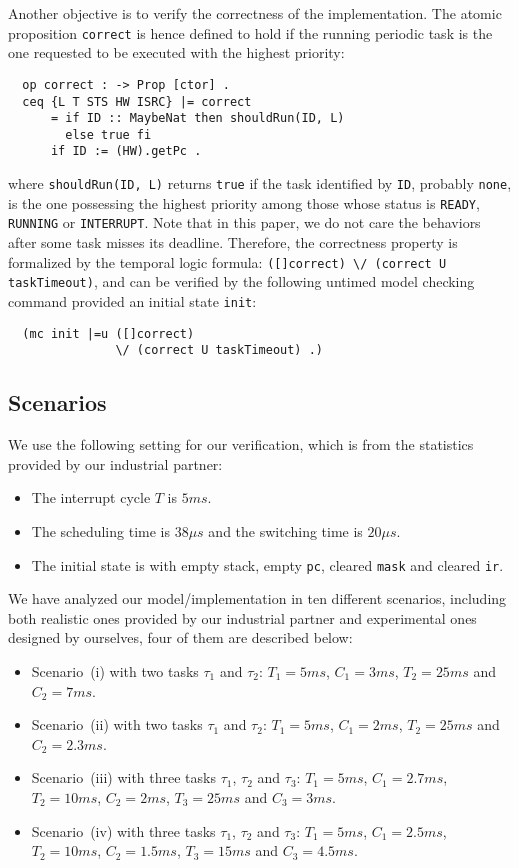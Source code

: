 \documentclass[10pt,journal]{IEEEtran}
\newcommand{\hide}[1]{\ignorespaces}
\begin{document}
Another objective is to verify the correctness of the implementation.
The atomic proposition \verb|correct| is hence defined to hold if the
running periodic task is the one requested to be executed with the
highest priority:
\begin{verbatim}
  op correct : -> Prop [ctor] .
  ceq {L T STS HW ISRC} |= correct
      = if ID :: MaybeNat then shouldRun(ID, L)
        else true fi
      if ID := (HW).getPc .
\end{verbatim}
where \verb|shouldRun(ID, L)| returns \verb|true| if the task
identified by \verb|ID|, probably \verb|none|, is the one possessing
the highest priority among those whose status is \verb|READY|,
\verb|RUNNING| or \verb|INTERRUPT|. Note that in this paper, we do not
care the behaviors after some task misses its deadline. Therefore, the
correctness property is formalized by the temporal logic formula:
\verb|([]correct) \/ (correct U taskTimeout)|, and can be verified by
the following untimed model checking command provided an initial state
\verb|init|:
\begin{verbatim}
  (mc init |=u ([]correct) 
               \/ (correct U taskTimeout) .)
\end{verbatim}

\subsection{Scenarios}
\label{ss:results}
We use the following setting for our verification, which is from the 
statistics provided by our industrial partner:
\begin{itemize}
\item The interrupt cycle $T$ is $5ms$.
\item The scheduling time is $38{\mu}s$ and the switching time is
  $20{\mu}s$.  
\hide{\item The scheduling time ranges from $5{\mu}s$
  to $9{\mu}s$, and the switching time ranges from $2{\mu}s$ to
  $4{\mu}s$.}
\item The initial state is with empty stack, empty \verb|pc|, cleared 
\verb|mask| and cleared \verb|ir|.
\end{itemize}

We have analyzed our model/implementation in ten different scenarios,
including both realistic ones provided by our industrial partner and
experimental ones designed by ourselves, four of them are described
below:
\begin{itemize}
\item Scenario~(i) with two tasks $\tau_1$ and $\tau_2$: $T_1=5ms$,
  $C_1=3ms$, $T_2=25ms$ and $C_2=7ms$.
\item Scenario~(ii) with two tasks $\tau_1$ and $\tau_2$: $T_1=5ms$,
  $C_1=2ms$, $T_2=25ms$ and $C_2=2.3ms$.
\item Scenario~(iii) with three tasks $\tau_1$, $\tau_2$ and $\tau_3$:
  $T_1=5ms$, $C_1=2.7ms$, $T_2=10ms$, $C_2=2ms$, $T_3=25ms$ and
  $C_3=3ms$.
\item Scenario~(iv) with three tasks $\tau_1$, $\tau_2$ and $\tau_3$:
  $T_1=5ms$, $C_1=2.5ms$, $T_2=10ms$, $C_2=1.5ms$, $T_3=15ms$ and
$C_3=4.5ms$.
\end{itemize}
\end{document}
